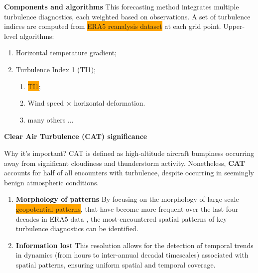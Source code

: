 \documentclass[9pt]{beamer}
\newcommand\Fontvi{\fontsize{6}{7.2}\selectfont}
\newcommand\Fonttab{\fontsize{12}{7.2}\selectfont}
\begin{document}
\begin{frame}[allowframebreaks]{\textbf{Components and algorithms}}
\Fonttab
This forecasting method integrates multiple turbulence diagnostics, each weighted based on observations. A set of turbulence indices are computed from \colorbox{orange}{ERA5 reanalysis dataset} \cite{faranda2024} at each grid point.  Upper-level algorithms:
 \begin{enumerate}[I]
\item Horizontal temperature gradient;
\item Turbulence Index 1 (TI1);
\begin{enumerate}[I]
\item \colorbox{orange}{TI1}; 
\item Wind speed $\times$ horizontal deformation.
\item many others ...
\end{enumerate}
\end{enumerate}
\end{frame}

\begin{frame}[allowframebreaks]{\textbf{Clear Air Turbulence (CAT) significance}}
\Fontvi
\begin{center}
\begin{exampleblock}{Why it's important?}
CAT is defined as high-altitude aircraft bumpiness occurring away from significant cloudiness and thunderstorm activity.  Nonetheless, \textbf{CAT} accounts for half of all encounters with turbulence, despite occurring in seemingly benign atmospheric conditions.
\begin{enumerate}
    \item \textbf{Morphology of patterns} By focusing on the morphology of large-scale \colorbox{orange}{geopotential patterns}, that have become more frequent over the last four decades in ERA5 data , the most-encountered spatial patterns of key turbulence diagnostics can be identified.
    \item \textbf{Information lost} This resolution allows for the detection of temporal trends in dynamics (from hours to inter-annual decadal timescales) associated with spatial patterns, ensuring uniform spatial and temporal coverage.
\end{enumerate}
\Fontvi
{}
\end{exampleblock}
\end{center}
\end{frame}
\end{document}
